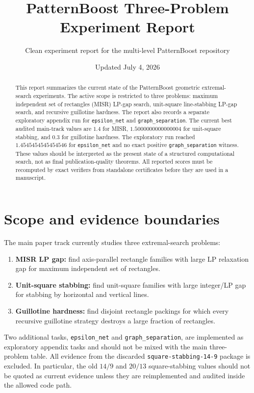 \documentclass[11pt]{article}
\title{PatternBoost Three-Problem Experiment Report}
\author{Clean experiment report for the multi-level PatternBoost repository}
\date{Updated July 4, 2026}
\newcommand{\code}[1]{\texttt{#1}}
\begin{document}
\maketitle

\begin{abstract}
This report summarizes the current state of the PatternBoost geometric
extremal-search experiments.  The active scope is restricted to three
problems: maximum independent set of rectangles (MISR) LP-gap search,
unit-square line-stabbing LP-gap search, and recursive guillotine hardness.
The report also records a separate exploratory appendix run for
\code{epsilon\_net} and \code{graph\_separation}.  The current best audited
main-track values are $1.4$ for MISR, $1.5000000000000004$ for unit-square
stabbing, and $0.3$ for guillotine hardness.  The exploratory run reached
$1.4545454545454546$ for \code{epsilon\_net} and no exact positive
\code{graph\_separation} witness.  These values should be interpreted as the
present state of a structured computational search, not as final
publication-quality theorems.  All reported scores must be recomputed by exact
verifiers from standalone certificates before they are used in a manuscript.
\end{abstract}

\tableofcontents
\clearpage

\section{Scope and evidence boundaries}

The main paper track currently studies three extremal-search problems:
\begin{enumerate}
\item \textbf{MISR LP gap:} find axis-parallel rectangle families with large
LP relaxation gap for maximum independent set of rectangles.
\item \textbf{Unit-square stabbing:} find unit-square families with large
integer/LP gap for stabbing by horizontal and vertical lines.
\item \textbf{Guillotine hardness:} find disjoint rectangle packings for which
every recursive guillotine strategy destroys a large fraction of rectangles.
\end{enumerate}

Two additional tasks, \code{epsilon\_net} and \code{graph\_separation}, are
implemented as exploratory appendix tasks and should not be mixed with the main
three-problem table.  All evidence from the discarded
\code{square-stabbing-14-9} package is excluded.  In particular, the old
$14/9$ and $20/13$ square-stabbing values should not be quoted as current
evidence unless they are reimplemented and audited inside the allowed code
path.
\end{document}

